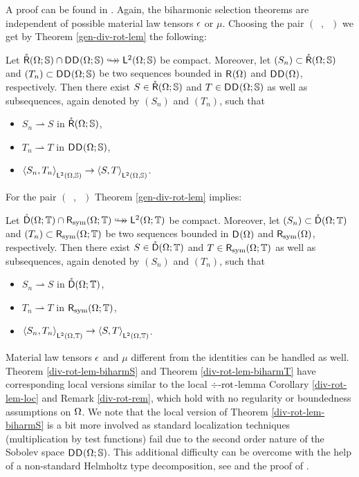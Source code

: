 \documentclass[a4paper]{amsart}
\newcommand{\wto}{\rightharpoonup}
\renewcommand{\rc}{\mathring\rsymbol}
\renewcommand{\dc}{\mathring\dsymbol}
\DeclareMathOperator{\Az}{A_{0}}
\DeclareMathOperator{\Ao}{A_{1}}
\DeclareMathOperator{\At}{A_{2}}
\newcommand{\cptemb}{\hookto\hspace*{-0.85em}\hookto}
\newcommand{\bbS}{\mathbb{S}}
\newcommand{\bbT}{\mathbb{T}}
\begin{document}
A proof can be found in \cite[Lemma 3.22]{paulyzulehnerbiharmonic}.
Again, the biharmonic selection theorems are independent of possible material law tensors $\epsilon$ or $\mu$.
Choosing the pair $(\Az,\Ao)$ we get by Theorem \ref{gen-div-rot-lem} the following:

\begin{theo}[global $\div\Div$-$\Rot$-$\bbS$-lemma]
Let $\rc(\om;\bbS)\cap\d\d(\om;\bbS)\cptemb\lt(\om;\bbS)$ be compact.
Moreover, let $(S_{n})\subset\rc(\om;\bbS)$ and $(T_{n})\subset\d\d(\om;\bbS)$ 
be two sequences bounded in $\overset{}{\mathsf{R}}{}^{}_{}(\Omega)$ and $\overset{}{\mathsf{D}}{}^{}_{}\overset{}{\mathsf{D}}{}^{}_{}(\Omega)$, respectively.
Then there exist $S\in\rc(\om;\bbS)$ and $T\in\d\d(\om;\bbS)$ as well as subsequences, 
again denoted by $(S_{n})$ and $(T_{n})$, 
such that
\begin{itemize}
\item
$S_{n}\wto S$ in $\rc(\om;\bbS)$, 
\item
$T_{n}\wto T$ in $\d\d(\om;\bbS)$, 
\item
$\scp{S_{n}}{T_{n}}_{\lt(\om,\bbS)}\to\scp{S}{T}_{\lt(\om,\bbS)}$.
\end{itemize}
\end{theo}

For the pair $(\Ao,\At)$ Theorem \ref{gen-div-rot-lem} implies: 

\begin{theo}[global $\sym\Rot$-$\Div$-$\bbT$-lemma]
Let $\dc(\om;\bbT)\cap\rsymbol_{\sym}(\om;\bbT)\cptemb\lt(\om;\bbT)$ be compact.
Moreover, let $(S_{n})\subset\dc(\om;\bbT)$ and $(T_{n})\subset\rsymbol_{\sym}(\om;\bbT)$ 
be two sequences bounded in $\overset{}{\mathsf{D}}{}^{}_{}(\Omega)$ and $\mathsf{R}_{\operatorname{sym}}(\Omega)$, respectively.
Then there exist $S\in\dc(\om;\bbT)$ and $T\in\rsymbol_{\sym}(\om;\bbT)$ as well as subsequences, 
again denoted by $(S_{n})$ and $(T_{n})$, 
such that
\begin{itemize}
\item
$S_{n}\wto S$ in $\dc(\om;\bbT)$, 
\item
$T_{n}\wto T$ in $\rsymbol_{\sym}(\om;\bbT)$, 
\item
$\scp{S_{n}}{T_{n}}_{\lt(\om,\bbT)}\to\scp{S}{T}_{\lt(\om,\bbT)}$.
\end{itemize}
\end{theo}

\begin{rem}
Material law tensors $\epsilon$ and $\mu$ different from the identities can be handled as well.
Theorem \ref{div-rot-lem-biharmS} and Theorem \ref{div-rot-lem-biharmT}
have corresponding local versions similar to 
the local $\div$-$\operatorname{rot}$-lemma Corollary \ref{div-rot-lem-loc} and Remark \ref{div-rot-rem}, 
which hold with no regularity or boundedness assumptions on $\Omega$.
We note that the local version of Theorem \ref{div-rot-lem-biharmS}
is a bit more involved as standard localization techniques 
(multiplication by test functions) fail
due to the second order nature of the Sobolev space $\d\d(\om;\bbS)$.
This additional difficulty can be overcome with the help of
a non-standard Helmholtz type decomposition, see \cite[Lemma 3.21]{paulyzulehnerbiharmonic}
and the proof of \cite[Lemma 3.22]{paulyzulehnerbiharmonic}.
\end{rem}
\end{document}
